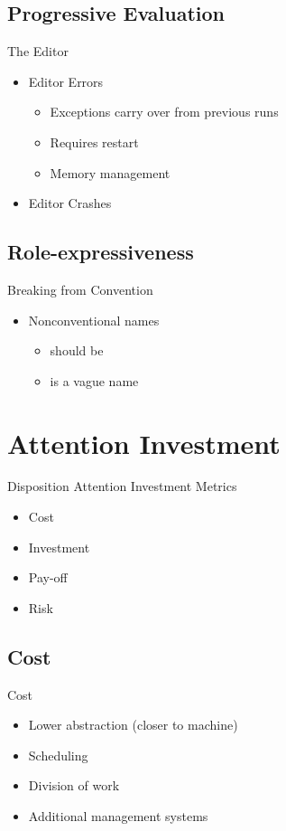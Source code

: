\subsection{Progressive Evaluation}
\begin{frame}{\secname}{\subsecname}
	The Editor
	\begin{itemize}
		\item<2-> Editor Errors
		\begin{itemize}
			\item<3-> Exceptions carry over from previous runs
			\item<4-> Requires restart
			\item<5-> Memory management
		\end{itemize}
		\item<6-> Editor Crashes
	\end{itemize}
\end{frame}

\subsection{Role-expressiveness}
\begin{frame}{\secname}{\subsecname}
	Breaking from Convention
	\begin{itemize}
		\item<2-> Nonconventional names
		\begin{itemize}
			\item<3->  should be 
			\item<4->  is a vague name
		\end{itemize}
	\end{itemize}
\end{frame}

\section{Attention Investment}
\begin{frame}{\secname}{Disposition}
	Attention Investment Metrics
	\begin{itemize}
		\item Cost
		\item Investment
		\item Pay-off
		\item Risk
	\end{itemize}
\end{frame}

\subsection{Cost}
\begin{frame}{\secname}{\subsecname}
	Cost
	\begin{itemize}
		\item<2-> Lower abstraction (closer to machine)
		\item<3-> Scheduling
		\item<4-> Division of work
		\item<5-> Additional management systems
	\end{itemize}
\end{frame}

